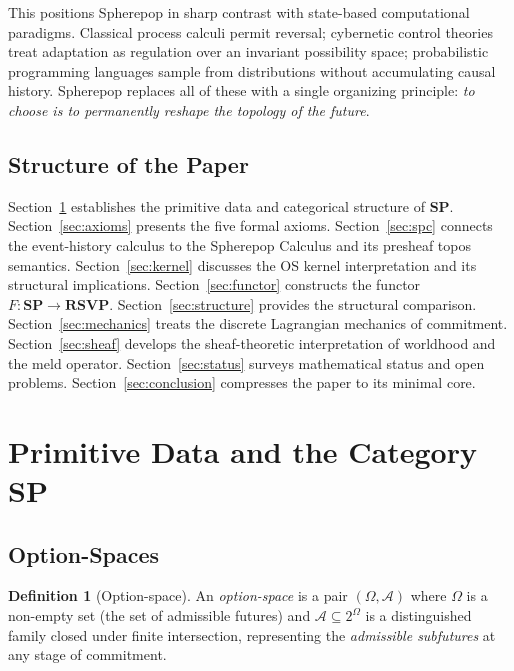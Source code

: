 \documentclass[12pt, a4paper]{article}
\theoremstyle{definition}
\newtheorem{definition}[theorem]{Definition}
\theoremstyle{remark}
\newcommand{\SP}{\mathbf{SP}}
\newcommand{\RSVP}{\mathbf{RSVP}}
\begin{document}
This positions Spherepop in sharp contrast with state-based computational paradigms.
Classical process calculi permit reversal; cybernetic control theories treat adaptation
as regulation over an invariant possibility space; probabilistic programming languages
sample from distributions without accumulating causal history. Spherepop replaces all
of these with a single organizing principle: \emph{to choose is to permanently reshape
the topology of the future}.

\subsection{Structure of the Paper}

Section~\ref{sec:primitives} establishes the primitive data and categorical structure
of $\SP$. Section~\ref{sec:axioms} presents the five formal axioms. Section~\ref{sec:spc}
connects the event-history calculus to the Spherepop Calculus and its presheaf topos
semantics. Section~\ref{sec:kernel} discusses the OS kernel interpretation and its
structural implications. Section~\ref{sec:functor} constructs the functor
$F : \SP \to \RSVP$. Section~\ref{sec:structure} provides the structural comparison.
Section~\ref{sec:mechanics} treats the discrete Lagrangian mechanics of commitment.
Section~\ref{sec:sheaf} develops the sheaf-theoretic interpretation of worldhood and
the meld operator. Section~\ref{sec:status} surveys mathematical status and open
problems. Section~\ref{sec:conclusion} compresses the paper to its minimal core.

\section{Primitive Data and the Category \texorpdfstring{$\SP$}{SP}}
\label{sec:primitives}

\subsection{Option-Spaces}

\begin{definition}[Option-space]
An \emph{option-space} is a pair $(\Omega, \mathcal{A})$ where $\Omega$ is a non-empty
set (the set of admissible futures) and $\mathcal{A} \subseteq 2^\Omega$ is a
distinguished family closed under finite intersection, representing the
\emph{admissible subfutures} at any stage of commitment.
\end{definition}
\end{document}
